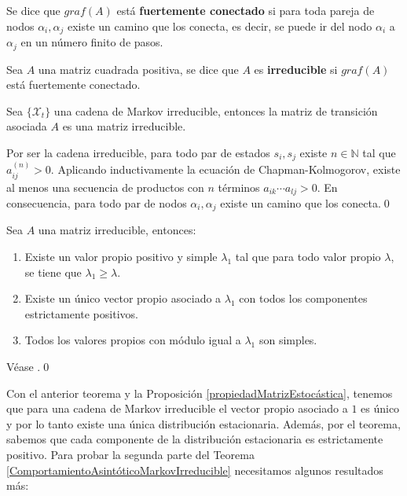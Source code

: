 \begin{definition}
Se dice que $graf(A)$ está \textbf{fuertemente conectado} si para toda pareja de nodos $\alpha_i, \alpha_j$ existe un camino que los conecta, es decir, se puede ir del nodo $\alpha_i$ a $\alpha_j$ en un número finito de pasos.
\end{definition}

\begin{definition}
Sea $A$ una matriz cuadrada positiva, se dice que $A$ es \textbf{irreducible} si $graf(A)$ está fuertemente conectado.
\end{definition}

\begin{proposition}
    Sea $\{\mathcal{X}_t\}$ una cadena de Markov irreducible, entonces la matriz de transición asociada $A$ es una matriz irreducible.
\end{proposition}
\begin{proofs*}
    Por ser la cadena irreducible, para todo par de estados $s_i,s_j$ existe $n\in\mathbb{N}$ tal que $a_{ij}^{(n)}>0$. Aplicando inductivamente la ecuación de Chapman-Kolmogorov, existe al menos una secuencia de productos con $n$ términos $a_{ik}\cdots a_{lj}>0$. En consecuencia, para todo par de nodos $\alpha_i,\alpha_j$ existe un camino que los conecta.\qed 
\end{proofs*}


\begin{theorem}
    Sea $A$ una matriz irreducible, entonces:
    \begin{enumerate}
        \item Existe un valor propio positivo y simple  $\lambda_1$ tal que para todo valor propio $\lambda$, se tiene que $\lambda_1\geq\lambda$.
        \item Existe un único vector propio asociado a $\lambda_1$ con todos los componentes estrictamente positivos.
        \item Todos los valores propios con módulo igual a $\lambda_1$ son simples.
    \end{enumerate}
\end{theorem}
\begin{proofs*}
    Véase \cite[Página 263, Teorema 7.13]{Salinelli}.\qed
\end{proofs*}
Con el anterior teorema y la Proposición \ref{propiedadMatrizEstocástica}, tenemos que para una cadena de Markov irreducible el vector propio asociado a $1$ es único y por lo tanto existe una única distribución estacionaria. Además, por el teorema, sabemos que cada componente de la distribución estacionaria es estrictamente positivo. Para probar la segunda parte del Teorema \ref{ComportamientoAsintóticoMarkovIrreducible} necesitamos algunos resultados más:

